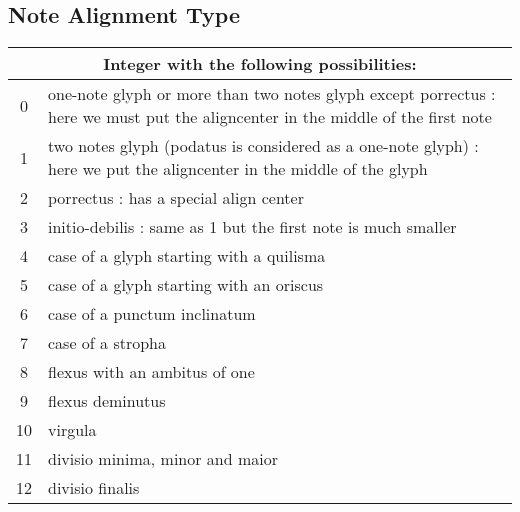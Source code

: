 \subsection{Note Alignment Type}\label{notesalign}
\begin{tabular}{cp{}}
  \multicolumn{2}{c}{Integer with the following possibilities:} \\
  \hline
  0 & one-note glyph or more than two notes glyph except porrectus : here we must put the aligncenter in the middle of the first note\\
  1 & two notes glyph (podatus is considered as a one-note glyph) : here we put the aligncenter in the middle of the glyph\\
  2 & porrectus : has a special align center\\
  3 & initio-debilis : same as 1 but the first note is much smaller\\
  4 & case of a glyph starting with a quilisma\\
  5 & case of a glyph starting with an oriscus\\
  6 & case of a punctum inclinatum\\
  7 & case of a stropha\\
  8 & flexus with an ambitus of one\\
  9 & flexus deminutus\\
  10 & virgula\\
  11 & divisio minima, minor and maior\\
  12 & divisio finalis
 \end{tabular}

